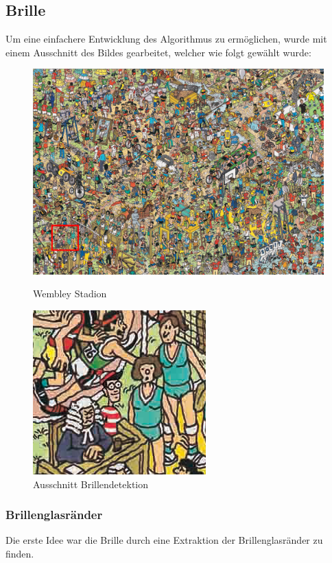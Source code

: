 \documentclass[paper=a4,fontsize=12pt]{scrartcl}
\begin{document}
\subsection*{Brille}
Um eine einfachere Entwicklung des Algorithmus zu ermöglichen, wurde mit einem Ausschnitt des Bildes gearbeitet, welcher wie folgt gewählt wurde:

\begin{figure}[htbp]
\centering
\begin{minipage}{.5\textwidth}
  \centering
  \includegraphics[height=.6\linewidth]{img/WallyWembleyGlassesSelection.png}
  \caption{Wembley Stadion}
\end{minipage}%
\begin{minipage}{.5\textwidth}
  \centering
  \includegraphics[height=.6\linewidth]{img/WallyWembleyCroppedGlasses.png}
  \caption{Ausschnitt Brillendetektion}
\end{minipage}
\end{figure}
\subsubsection*{Brillenglasränder} 
Die erste Idee war die Brille durch eine Extraktion der Brillenglasränder zu finden.
\end{document}
